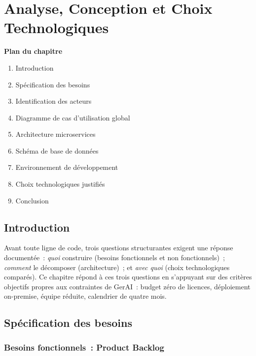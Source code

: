 \chapter{Analyse, Conception et Choix Technologiques}

\noindent\textbf{Plan du chapitre}
\begin{enumerate}[nosep]
  \item Introduction
  \item Spécification des besoins
  \item Identification des acteurs
  \item Diagramme de cas d'utilisation global
  \item Architecture microservices
  \item Schéma de base de données
  \item Environnement de développement
  \item Choix technologiques justifiés
  \item Conclusion
\end{enumerate}

\section{Introduction}

Avant toute ligne de code, trois questions structurantes exigent une réponse
documentée~: \textit{quoi} construire (besoins fonctionnels et non fonctionnels)~;
\textit{comment} le décomposer (architecture)~; et \textit{avec quoi} (choix
technologiques comparés). Ce chapitre répond à ces trois questions en s'appuyant
sur des critères objectifs propres aux contraintes de GerAI~: budget zéro de
licences, déploiement on-premise, équipe réduite, calendrier de quatre mois.

\section{Spécification des besoins}

\subsection{Besoins fonctionnels~: Product Backlog}

